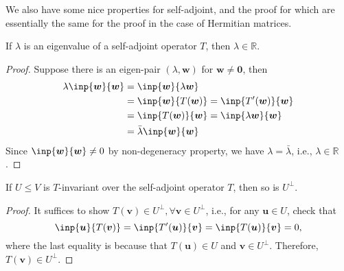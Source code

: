 We also have some nice properties for self-adjoint, and the proof for which are essentially the same for the proof in the case of Hermitian matrices.
\begin{proposition}\label{pro:11:1}
If $\lambda$ is an eigenvalue of a self-adjoint operator $T$, then $\lambda\in\mathbb{R}$. 
\end{proposition}
\begin{proof}
Suppose there is an eigen-pair $(\lambda,\bm w)$ for $\bm w\ne\bm0$, then
\begin{align*}
\lambda\inp{\bm w}{\bm w}&=\inp{\bm w}{\lambda\bm w}\\
&=\inp{\bm w}{T(\bm w)}
=\inp{T'(\bm w)}{\bm w}\\
&=\inp{T(\bm w)}{\bm w}
=\inp{\lambda\bm w}{\bm w}\\
&=\bar{\lambda}\inp{\bm w}{\bm w}
\end{align*}
Since $\inp{\bm w}{\bm w}\ne0$ by non-degeneracy property, we have $\lambda=\bar{\lambda}$, i.e., $\lambda\in\mathbb{R}$.
\end{proof}

\begin{proposition}
If $U\le V$ is $T$-invariant over the self-adjoint operator $T$, then so is $U^\perp$.
\end{proposition}
\begin{proof}
It suffices to show $T(\bm v)\in U^\perp,\forall\bm v\in U^\perp$, i.e., for any $\bm u\in U$, check that
\[
\inp{\bm u}{T(\bm v)}=\inp{T'(\bm u)}{\bm v}=\inp{T(\bm u)}{\bm v}=0,
\]
where the last equality is because that $T(\bm u)\in U$ and $\bm v\in U^\perp$.
Therefore, $T(\bm v)\in U^\perp$.
\end{proof}

